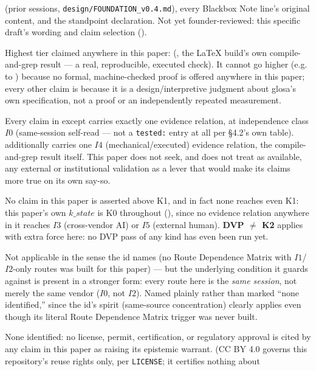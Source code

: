 \begin{disclaimers}
    (prior sessions, \texttt{design/FOUNDATION\_v0.4.md}), every Blackbox Note line's original
    content, and the standpoint declaration. Not yet founder-reviewed: this specific draft's
    wording and claim selection ().
  \item[D-TIER] Highest tier claimed anywhere in this paper: \FiniteDiag{} (, the
    LaTeX build's own compile-and-grep result — a real, reproducible, executed check). It cannot go
    higher (e.g. to \ThCoqc{}) because no formal, machine-checked proof is offered anywhere in this
    paper; every other claim is \DrTier{} because it is a design/interpretive judgment about
    glosa's own specification, not a proof or an independently repeated measurement.
  \item[D-INDEPENDENCE] Every claim in  except  carries
    exactly one evidence relation, at independence class $I0$ (same-session self-read — not a
    \texttt{tested:} entry at all per \S4.2's own table).  additionally carries one
    $I4$ (mechanical/executed) evidence relation, the compile-and-grep result itself. This paper
    does not seek, and does not treat as available, any external or institutional validation as a
    lever that would make its claims more true on its own say-so.
  \item[D-DVP-NOT-K2] No claim in this paper is asserted above K1, and in fact none reaches even
    K1: this paper's own $k\_state$ is K0 throughout (), since no evidence relation
    anywhere in it reaches $I3$ (cross-vendor AI) or $I5$ (external human). \textbf{DVP $\neq$ K2}
    applies with extra force here: no DVP pass of any kind has even been run yet.
  \item[D-SAME-VENDOR] Not applicable in the sense the id names (no Route Dependence Matrix with
    $I1$/$I2$-only routes was built for this paper) — but the underlying condition it guards
    against is present in a stronger form: every route here is the \emph{same session}, not merely
    the same vendor ($I0$, not $I2$). Named plainly rather than marked ``none identified,'' since
    the id's spirit (same-source concentration) clearly applies even though its literal Route
    Dependence Matrix trigger was never built.
  \item[D-LEGAL-NEQ-EPISTEMIC] None identified: no license, permit, certification, or regulatory
    approval is cited by any claim in this paper as raising its epistemic warrant. (CC BY 4.0
    governs this repository's reuse rights only, per \texttt{LICENSE}; it certifies nothing about

\end{disclaimers}
